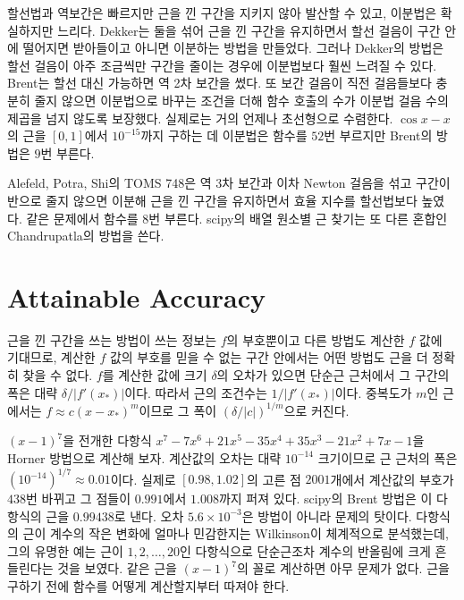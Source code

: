 할선법과 역보간은 빠르지만 근을 낀 구간을 지키지 않아 발산할 수 있고, 이분법은 확실하지만 느리다. Dekker는 둘을 섞어 근을 낀 구간을 유지하면서 할선 걸음이 구간 안에 떨어지면 받아들이고 아니면 이분하는 방법을 만들었다\cite{dekker1969}. 그러나 Dekker의 방법은 할선 걸음이 아주 조금씩만 구간을 줄이는 경우에 이분법보다 훨씬 느려질 수 있다. Brent는 할선 대신 가능하면 역 2차 보간을 썼다. 또 보간 걸음이 직전 걸음들보다 충분히 줄지 않으면 이분법으로 바꾸는 조건을 더해 함수 호출의 수가 이분법 걸음 수의 제곱을 넘지 않도록 보장했다\cite{brent1973}. 실제로는 거의 언제나 초선형으로 수렴한다. $\cos x-x$의 근을 $[0,1]$에서 $10^{-15}$까지 구하는 데 이분법은 함수를 $52$번 부르지만 Brent의 방법은 $9$번 부른다.

Alefeld, Potra, Shi의 TOMS 748은 역 3차 보간과 이차 Newton 걸음을 섞고 구간이 반으로 줄지 않으면 이분해 근을 낀 구간을 유지하면서 효율 지수를 할선법보다 높였다\cite{alefeld1995}. 같은 문제에서 함수를 $8$번 부른다. scipy의 배열 원소별 근 찾기는 또 다른 혼합인 Chandrupatla의 방법을 쓴다\cite{chandrupatla1997}.

\section{Attainable Accuracy}
\label{sec:root-accuracy}

근을 낀 구간을 쓰는 방법이 쓰는 정보는 $f$의 부호뿐이고 다른 방법도 계산한 $f$ 값에 기대므로, 계산한 $f$ 값의 부호를 믿을 수 없는 구간 안에서는 어떤 방법도 근을 더 정확히 찾을 수 없다. $f$를 계산한 값에 크기 $\delta$의 오차가 있으면 단순근 근처에서 그 구간의 폭은 대략 $\delta/|f'(x_\ast)|$이다. 따라서 근의 조건수는 $1/|f'(x_\ast)|$이다. 중복도가 $m$인 근에서는 $f\approx c(x-x_\ast)^m$이므로 그 폭이 $(\delta/|c|)^{1/m}$으로 커진다.

$(x-1)^7$을 전개한 다항식 $x^7-7x^6+21x^5-35x^4+35x^3-21x^2+7x-1$을 Horner 방법으로 계산해 보자. 계산값의 오차는 대략 $10^{-14}$ 크기이므로 근 근처의 폭은 $(10^{-14})^{1/7}\approx0.01$이다. 실제로 $[0.98,1.02]$의 고른 점 $2001$개에서 계산값의 부호가 $438$번 바뀌고 그 점들이 $0.991$에서 $1.008$까지 퍼져 있다. scipy의 Brent 방법은 이 다항식의 근을 $0.99438$로 낸다. 오차 $5.6\times10^{-3}$은 방법이 아니라 문제의 탓이다. 다항식의 근이 계수의 작은 변화에 얼마나 민감한지는 Wilkinson이 체계적으로 분석했는데, 그의 유명한 예는 근이 $1,2,\dots,20$인 다항식으로 단순근조차 계수의 반올림에 크게 흔들린다는 것을 보였다\cite{wilkinson1959polynomials}. 같은 근을 $(x-1)^7$의 꼴로 계산하면 아무 문제가 없다. 근을 구하기 전에 함수를 어떻게 계산할지부터 따져야 한다.

